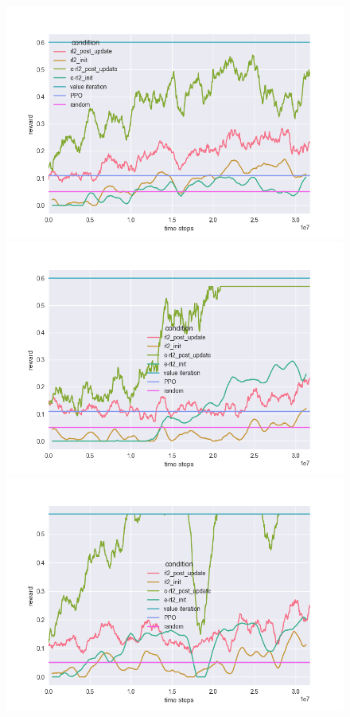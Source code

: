 \documentclass{article} %
\begin{document}
\begin{figure}[H]
\begin{center}
\includegraphics[scale=0.16]{bradly_curves/gap_grids_rl2_0.png}%
\includegraphics[scale=0.16]{bradly_curves/gap_grids_rl2_1.png}
\includegraphics[scale=0.16]{bradly_curves/gap_grids_rl2_2.png}%

\end{center}
\end{figure}
\end{document}

